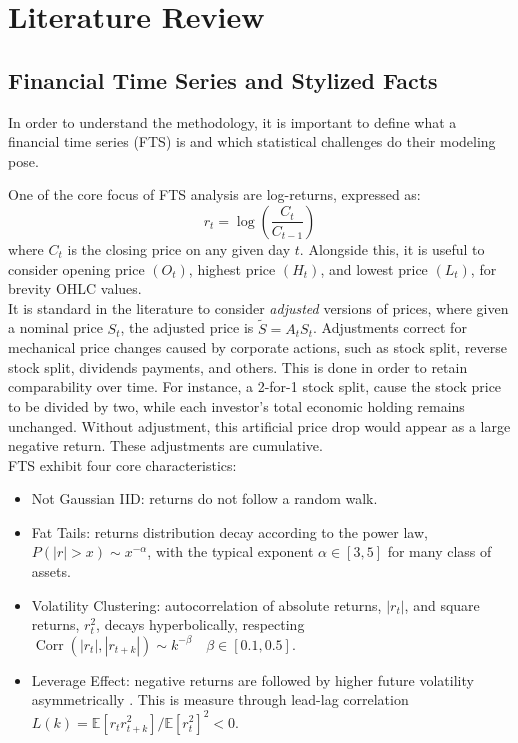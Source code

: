\chapter{Literature Review}
\section{Financial Time Series and Stylized Facts}
In order to understand the methodology, it is important to define what a financial time series (FTS) is and which statistical challenges do their modeling pose.

One of the core focus of FTS analysis are log-returns, expressed as:
\begin{equation}
    \label{eq:log_returns}
    r_t=\log\left(\frac{C_t}{C_{t-1}}\right)
\end{equation}
where $C_t$ is the closing price on any given day $t$. Alongside this, it is useful to consider opening price $\left(O_t\right)$, highest price $\left(H_t\right)$, and lowest price $\left(L_t\right)$, for brevity OHLC values.\\

It is standard in the literature to consider \textit{adjusted} versions of prices, where given a nominal price $S_t$, the adjusted price is $\widetilde{S}=A_tS_t$.
Adjustments correct for mechanical price changes caused by corporate actions, such as stock split, reverse stock split, dividends payments, and others. This is done in order to retain comparability over time. For instance, a 2-for-1 stock split, cause the stock price to be divided by two, while each investor's total economic holding remains unchanged. Without adjustment, this artificial price drop would appear as a large negative return. These adjustments are cumulative.\\

FTS exhibit four core characteristics:
\begin{itemize}
    \item Not Gaussian IID: returns do not follow a random walk.
    \item Fat Tails: returns distribution decay according to the power law, $P(|r|>x)\sim x^{-\alpha}$, with the typical exponent $\alpha\in[3,5]$ for many class of assets.
    \item Volatility Clustering: autocorrelation of absolute returns, $|r_t|$, and square returns, \(r^2_t\), decays hyperbolically, respecting \(\operatorname{Corr}(|r_t|, |r_{t+k}|)\sim k^{-\beta} \quad \beta\in [0.1,0.5]\).
    \item Leverage Effect: negative returns are followed by higher future volatility asymmetrically \cite{black1976studies}. This is measure through lead-lag correlation \(L(k)=\mathbb{E}\left[r_tr_{t+k}^2 \right]/\mathbb{E}\left[r_t^2\right]^2<0\).
\end{itemize}

